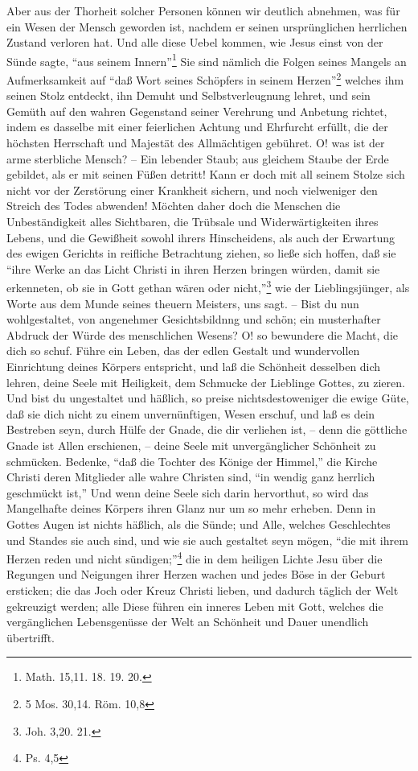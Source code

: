 Aber aus der Thorheit solcher Personen können wir deutlich abnehmen, was für ein
Wesen der Mensch geworden ist, nachdem er seinen ursprünglichen herrlichen
Zustand verloren hat. Und alle diese Uebel kommen, wie Jesus einst von der Sünde
sagte, "`aus seinem Innern"'\footnote{Math. 15,11. 18. 19. 20.} Sie sind nämlich
die Folgen seines Mangels an Aufmerksamkeit auf "`daß Wort seines Schöpfers in
seinem Herzen"'\footnote{5 Mos. 30,14. Röm. 10,8} welches ihm seinen Stolz
entdeckt, ihn Demuht und Selbstverleugnung lehret, und sein Gemüth auf den
wahren Gegenstand seiner Verehrung und Anbetung richtet, indem es dasselbe mit
einer feierlichen Achtung und Ehrfurcht erfüllt, die der höchsten Herrschaft und
Majestät des Allmächtigen gebühret. O! was ist der arme sterbliche Mensch? --
Ein lebender Staub; aus gleichem Staube der Erde gebildet, als er mit seinen
Füßen detritt! Kann er doch mit all seinem Stolze sich nicht vor der Zerstörung
einer Krankheit sichern, und noch vielweniger den Streich des Todes abwenden!
Möchten daher doch die Menschen die Unbeständigkeit alles Sichtbaren, die
Trübsale und Widerwärtigkeiten ihres Lebens, und die Gewißheit sowohl ihrers
Hinscheidens, als auch der Erwartung des ewigen Gerichts in reifliche
Betrachtung ziehen, so ließe sich hoffen, daß sie "`ihre Werke an das Licht
Christi in ihren Herzen bringen würden, damit sie erkenneten, ob sie in Gott
gethan wären oder nicht,"'\footnote{Joh. 3,20. 21.} wie der Lieblingsjünger, als
Worte aus dem Munde seines theuern Meisters, uns sagt. -- Bist du nun
wohlgestaltet, von angenehmer Gesichtsbildnng und schön; ein musterhafter
Abdruck der Würde des menschlichen Wesens? O! so bewundere die Macht, die dich
so schuf. Führe ein Leben, das der edlen Gestalt und wundervollen Einrichtung
deines Körpers entspricht, und laß die Schönheit desselben dich lehren, deine
Seele mit Heiligkeit, dem Schmucke der Lieblinge Gottes, zu zieren. Und bist du
ungestaltet und häßlich, so preise nichtsdestoweniger die ewige Güte, daß sie
dich nicht zu einem unvernünftigen, Wesen erschuf, und laß es dein Bestreben
seyn, durch Hülfe der Gnade, die dir verliehen ist, -- denn die göttliche Gnade
ist Allen erschienen, -- deine Seele mit unvergänglicher Schönheit zu schmücken.
Bedenke, "`daß die Tochter des Könige der Himmel,"' die Kirche Christi deren
Mitglieder alle wahre Christen sind, "`in wendig ganz herrlich geschmückt ist,"'
Und wenn deine Seele sich  darin hervorthut, so wird das Mangelhafte deines
Körpers ihren Glanz nur um so mehr erheben. Denn in Gottes Augen ist nichts
häßlich, als die Sünde; und Alle, welches Geschlechtes und Standes sie auch
sind, und wie sie auch gestaltet seyn mögen, "`die mit ihrem Herzen reden und
nicht sündigen;"'\footnote{Ps. 4,5} die in dem heiligen Lichte Jesu über die
Regungen und Neigungen ihrer Herzen wachen und jedes Böse in der Geburt
ersticken; die das Joch oder Kreuz Christi lieben, und dadurch täglich der Welt
gekreuzigt werden; alle Diese führen ein inneres Leben mit Gott, welches die
vergänglichen Lebensgenüsse der Welt an Schönheit und Dauer unendlich
übertrifft.
